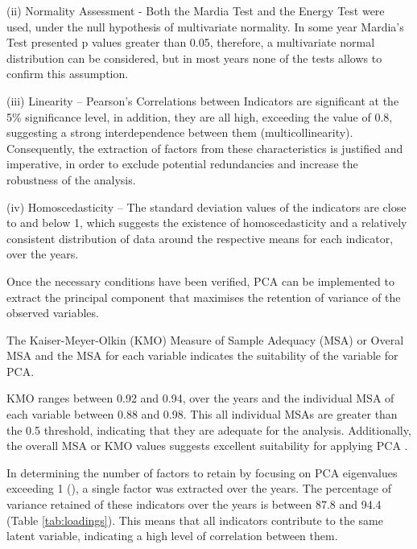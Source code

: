 \documentclass[conference]{IEEEtran}
\begin{document}
(ii) Normality Assessment - Both the Mardia Test and the Energy Test were used, under the null hypothesis of multivariate normality.
In some year Mardia's Test presented p values greater than 0.05, therefore, a multivariate normal distribution can be considered, but in most years none of the tests allows to confirm this assumption.

(iii) Linearity -- Pearson's Correlations between Indicators are significant at the 5\% significance level, in addition, they are all high, exceeding the value of 0.8, suggesting a strong interdependence between them (multicollinearity).
Consequently, the extraction of factors from these characteristics is justified and imperative, in order to exclude potential redundancies and increase the robustness of the analysis.

(iv) Homoscedasticity -- The standard deviation values of the indicators are close to and below 1, which suggests the existence of homoscedasticity and a relatively consistent distribution of data around the respective means for each indicator, over the years.

Once the necessary conditions have been verified, PCA can be implemented to extract the principal component that maximises the retention of variance of the observed variables.

The Kaiser-Meyer-Olkin (KMO) Measure of Sample Adequacy (MSA) or Overal MSA and the MSA for each variable indicates the suitability of the variable for PCA. 

KMO ranges between 0.92 and 0.94, over the years
and the individual MSA of each variable between 0.88 and 0.98.
This all individual MSAs are greater than the 0.5 threshold, indicating that they are adequate for the analysis. Additionally, the overall MSA or KMO  values suggests excellent suitability for applying PCA \cite{maroco2018analise}. 



In determining the number of factors to retain by focusing on PCA eigenvalues  exceeding 1 (\cite{carroll1978effect}), a single factor was extracted  over the years. The percentage of variance retained of these indicators over the years is between 87.8 and 94.4 (Table \ref{tab:loadings}). 
This means that all indicators contribute to the same latent variable, indicating a high level of correlation between them.
\end{document}
